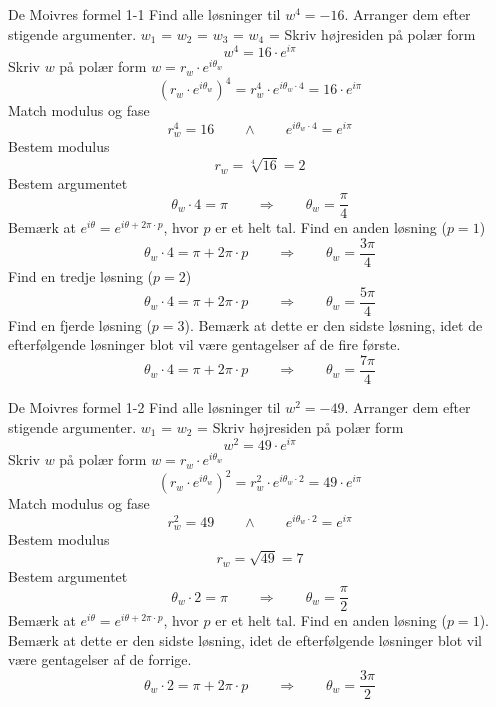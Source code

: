 \documentclass{article}
\begin{document}
\tableofcontents
\newpage
\begin{exercise}{De Moivres formel 1-1}
Find alle løsninger til $w^4 = - 16$.
Arranger dem efter stigende argumenter.
$w_1$ = 
$w_2$ = 
$w_3$ = 
$w_4$ = 
\hint
Skriv højresiden på polær form
\[w^4 = 16 \cdot e^{i \pi}
\]
\hint
Skriv $w$ på polær form $w = r_w \cdot e^{i \theta_w}$
\[\left(r_w \cdot e^{i \theta_w}\right)^4 = r_w^4 \cdot e^{i \theta_w \cdot 4} = 16 \cdot e^{i \pi}
\]
\hint
Match modulus og fase
\[r_w^4 = 16 \qquad \wedge \qquad e^{i \theta_w \cdot 4} = e^{i \pi}
\]
\hint
Bestem modulus
\[r_w = \sqrt[4]{16} = 2
\]
\hint
Bestem argumentet
\[\theta_w \cdot 4 = \pi \qquad \Rightarrow \qquad \theta_w = \frac{\pi}{4}
\]
\hint
Bemærk at $e^{i \theta} = e^{i \theta + 2 \pi \cdot p}$, hvor $p$ er et helt tal.
\hint
Find en anden løsning ($p = 1$)
\[\theta_w \cdot 4 = \pi + 2 \pi \cdot p \qquad \Rightarrow \qquad \theta_w = \frac{3 \pi}{4}
\]
\hint
Find en tredje løsning ($p = 2$)
\[\theta_w \cdot 4 = \pi + 2 \pi \cdot p \qquad \Rightarrow \qquad \theta_w = \frac{5 \pi}{4}
\]
\hint
Find en fjerde løsning ($p = 3$).
Bemærk at dette er den sidste løsning, idet de efterfølgende
løsninger blot vil være gentagelser af de fire første.
\[\theta_w \cdot 4 = \pi + 2 \pi \cdot p \qquad \Rightarrow \qquad \theta_w = \frac{7 \pi}{4}
\]
\end{exercise}
\newpage
\begin{exercise}{De Moivres formel 1-2}
Find alle løsninger til $w^2 = - 49$.
Arranger dem efter stigende argumenter.
$w_1$ = 
$w_2$ = 
\hint
Skriv højresiden på polær form
\[w^2 = 49 \cdot e^{i \pi}
\]
\hint
Skriv $w$ på polær form $w = r_w \cdot e^{i \theta_w}$
\[\left(r_w \cdot e^{i \theta_w}\right)^2 = r_w^2 \cdot e^{i \theta_w \cdot 2} = 49 \cdot e^{i \pi}
\]
\hint
Match modulus og fase
\[r_w^2 = 49 \qquad \wedge \qquad e^{i \theta_w \cdot 2} = e^{i \pi}
\]
\hint
Bestem modulus
\[r_w = \sqrt{49} = 7
\]
\hint
Bestem argumentet
\[\theta_w \cdot 2 = \pi \qquad \Rightarrow \qquad \theta_w = \frac{\pi}{2}
\]
\hint
Bemærk at $e^{i \theta} = e^{i \theta + 2 \pi \cdot p}$, hvor $p$ er et helt tal.
\hint
Find en anden løsning ($p = 1$).
Bemærk at dette er den sidste løsning, idet de efterfølgende
løsninger blot vil være gentagelser af de forrige.
\[\theta_w \cdot 2 = \pi + 2 \pi \cdot p \qquad \Rightarrow \qquad \theta_w = \frac{3 \pi}{2}
\]
\end{exercise}
\end{document}
